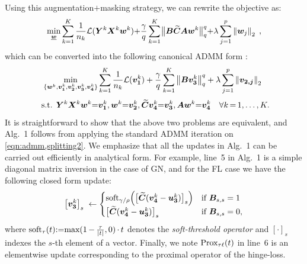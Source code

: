 \hspace{-1pt}Using this augmentation$+$masking strategy, we can rewrite the objective as:
\begin{equation}
		\min_{\underline{{\bm{w}}}} 
			\sum_{k=1}^K\hspace{-0pt}\frac{1}{n_k}\mathcal{L}({\bm{Y}}^k{\bm{X}}^k{\bm{w}}^k){+}
			\frac{\gamma}{q}\hspace{-0pt}\sum_{k=1}^K\hspace{-1pt}
			\big\|{\bm{B}}{\bm{\widetilde{C}}}{\bm{A}}{\bm{w}}^k\big\|_q^q\hspace{-0pt}{+}
			\lambda\hspace{-0pt}\sum_{j=1}^p\left\| {\bm{w}}_j \right\|_2 \;,  
	\nonumber
\end{equation}
which can be converted into the following canonical ADMM form \hspace{-1.5pt}\cite{Boyd:2011}:\hspace{-1.5pt}
\begin{equation}
		\displaystyle\min_{\{\wk, \vak, \vbk, \vck, \vdk\}} 
			\sum_{k=1}^K\frac{1}{n_k}\Loss(\vak) + 
			\frac{\gamma}{q}\sum_{k=1}^K\norm{\B\vck}_q^q + 
				\lambda\sum_{j=1}^p\norm{\bmath{v_{2,j}}}_2
 \; 
	\nonumber
\vspace{-3pt}\end{equation}
\begin{equation}\vspace{-5pt}
		\text{ s.t. }  \Yk\Xk\wk{=}\vak,\wk{=}\vbk,  \Ctil\vdk{=}\vck,  \A\wk{=}\vdk \quad \forall k\,{=}\,1,\dots,K.
	\label{eqn:admm,splitting2}
\end{equation}
It is straightforward to show that the above two problems are equivalent, and Alg.~1 follows from applying the standard ADMM iteration on \eqref{eqn:admm,splitting2}.
We emphasize that all the updates in Alg.~1 can be carried out efficiently in analytical form.
\newcommand{\IDX}{s}
For example, line~5 in Alg.~1 is a simple diagonal matrix inversion in the case of GN, and for the FL case we have the following closed form update:
\vspace{-1pt}\begin{equation}\vspace{-1pt}
	\left[\vck\right]_\IDX \;\leftarrow
	\begin{cases}
		\soft_{\gamma/\rho}\Big(\big[\Ctil(\vdk-\uck)\big]_\IDX\Big) 
			& \text{if } \B_{\IDX,\IDX}=1 \\
		\big[\Ctil(\vdk-\uck)\big]_\IDX & \text{if } \B_{\IDX,\IDX}=0,
	\end{cases}
\label{eqn:prox}
\end{equation}
where  
$\text{soft}_{\tau}(t){:=}\text{max}(1\,{-}\,\frac{\tau}{\left| t \right|},0)\,{\cdot}\,t$
denotes the \emph{soft-threshold operator} and $\left[\cdot\right]_\IDX$ indexes the $\IDX$-th element of a vector.
Finally, we note $\text{Prox}_{\tau\ell}(t)$ in line~6 is an elementwise update corresponding to the proximal operator of the hinge-loss.
